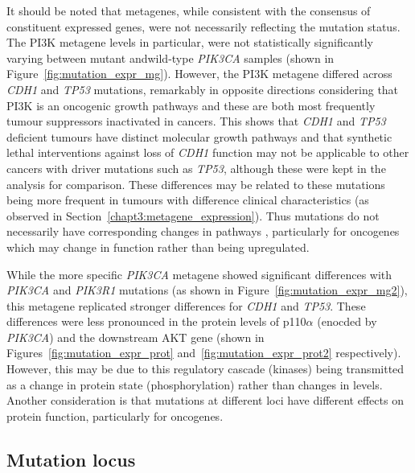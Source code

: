 It should be noted that \glspl{metagene}, while consistent with the consensus of constituent expressed genes, were not necessarily reflecting the  \gls{mutation} status. The PI3K \citep{Gatza2011} \gls{metagene} levels in particular, were not statistically significantly varying between \gls{mutant} and\gls{wild-type} \textit{PIK3CA} samples (shown in Figure~\ref{fig:mutation_expr_mg}). However, the PI3K \gls{metagene} differed across \textit{CDH1} and \textit{TP53} \glspl{mutation}, remarkably in opposite directions considering that PI3K is an oncogenic growth \glspl{pathway} and these are both most frequently \glspl{tumour suppressor} inactivated in cancers. This shows that \textit{CDH1} and \textit{TP53} deficient tumours have distinct molecular growth \glspl{pathway} and that \gls{synthetic lethal} interventions against loss of \textit{CDH1} function may not be applicable to other cancers with \glspl{driver mutation} such as \textit{TP53}, although these were kept in the analysis for comparison. These differences may be related to these \glspl{mutation} being more frequent in tumours with difference clinical characteristics (as observed in Section~\ref{chapt3:metagene_expression}).  Thus \glspl{mutation} do not necessarily have corresponding changes in \glspl{pathway} , particularly for \glspl{oncogene} which may change in function rather than being upregulated.


While the more specific \textit{PIK3CA} \citep{Gatza2014} \gls{metagene} showed significant differences with \textit{PIK3CA} and \textit{PIK3R1} \glspl{mutation} (as shown in Figure~\ref{fig:mutation_expr_mg2}), this \gls{metagene} replicated stronger differences for \textit{CDH1} and \textit{TP53}.  These differences were less pronounced in the protein levels of p110$\alpha$ (enocded by \textit{PIK3CA}) and the downstream AKT gene (shown in Figures~\ref{fig:mutation_expr_prot} and~\ref{fig:mutation_expr_prot2} respectively). However, this may be due to this regulatory cascade (kinases) being transmitted as a change in protein state (phosphorylation) rather than changes in  levels. Another consideration is that \glspl{mutation} at different loci have different effects on protein function, particularly for \glspl{oncogene}.
\fi
\FloatBarrier

\iffalse
\subsection{Mutation locus}  \label{chapt3:metagene_mut_locus}

